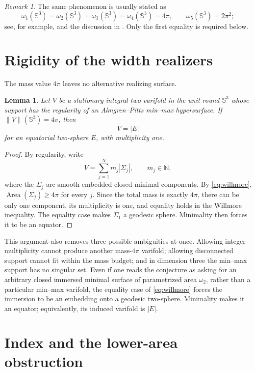 \documentclass[11pt]{article}
\newtheorem{lemma}[theorem]{Lemma}
\theoremstyle{remark}
\newtheorem{remark}[theorem]{Remark}
\newcommand{\Sph}{\mathbb S}
\newcommand{\Area}{\operatorname{Area}}
\begin{document}
\begin{remark}
The same phenomenon is usually stated as
\[
  \omega_1(\Sph^3)=\omega_2(\Sph^3)
  =\omega_3(\Sph^3)=\omega_4(\Sph^3)=4\pi,
  \qquad
  \omega_5(\Sph^3)=2\pi^2;
\]
see, for example, \cite{Nurser} and the discussion in
\cite{ChenGaspar}.  Only the first equality is required below.
\end{remark}

\section{Rigidity of the width realizers}

The mass value $4\pi$ leaves no alternative realizing surface.

\begin{lemma}\label{lem:rigidity}
Let $V$ be a stationary integral two-varifold in the unit round
$\Sph^3$ whose support has the regularity of an Almgren--Pitts min--max
hypersurface.  If $\|V\|(\Sph^3)=4\pi$, then
\[
  V=|E|
\]
for an equatorial two-sphere $E$, with multiplicity one.
\end{lemma}

\begin{proof}
By regularity, write
\[
  V=\sum_{j=1}^N m_j|\Sigma_j|,
  \qquad m_j\in\mathbb N,
\]
where the $\Sigma_j$ are smooth embedded closed minimal components.  By
\eqref{eq:willmore}, $\Area(\Sigma_j)\geq4\pi$ for every $j$.  Since the
total mass is exactly $4\pi$, there can be only one component, its
multiplicity is one, and equality holds in the Willmore inequality.  The
equality case makes $\Sigma_1$ a geodesic sphere.  Minimality then forces
it to be an equator.
\end{proof}

This argument also removes three possible ambiguities at once.  Allowing
integer multiplicity cannot produce another mass-$4\pi$ varifold;
allowing disconnected support cannot fit within the mass budget; and in
dimension three the min--max support has no singular set.  Even if one
reads the conjecture as asking for an arbitrary closed immersed minimal
surface of parametrized area $\omega_2$, rather than a particular min--max
varifold, the equality case of \eqref{eq:willmore} forces the immersion to
be an embedding onto a geodesic two-sphere.  Minimality makes it an equator;
equivalently, its induced varifold is $|E|$.

\section{Index and the lower-area obstruction}
\end{document}
